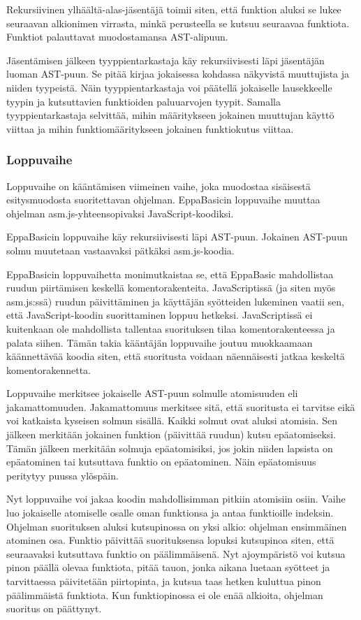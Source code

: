 Rekursiivinen ylhäältä-alas-jäsentäjä
toimii siten, että funktion aluksi
se lukee seuraavan alkionimen virrasta,
minkä perusteella se kutsuu seuraavaa
funktiota.
Funktiot palauttavat muodostamansa
AST-alipuun.

Jäsentämisen jälkeen tyyppientarkastaja
käy rekursiivisesti läpi jäsentäjän
luoman AST-puun.
Se pitää kirjaa jokaisessa kohdassa
näkyvistä muuttujista ja niiden tyypeistä.
Näin tyyppientarkastaja voi päätellä
jokaiselle lausekkeelle tyypin
ja kutsuttavien funktioiden
paluuarvojen tyypit.
Samalla tyyppientarkastaja selvittää,
mihin määritykseen jokainen muuttujan
käyttö viittaa ja mihin funktiomääritykseen
jokainen funktiokutus viittaa.

\subsubsection{Loppuvaihe}
Loppuvaihe on kääntämisen viimeinen vaihe,
joka muodostaa sisäisestä esitysmuodosta
suoritettavan ohjelman.
EppaBasicin loppuvaihe muuttaa ohjelman
asm.js-yhteensopi\-vaksi \cite{asm.js}
JavaScript-koodiksi.

EppaBasicin loppuvaihe käy rekursiivisesti
läpi AST-puun.
Jokainen AST-puun solmu muutetaan
vastaavaksi pätkäksi asm.js-koodia.

EppaBasicin loppuvaihetta monimutkaistaa se,
että EppaBasic mahdollistaa ruudun piirtämisen
keskellä komentorakenteita.
JavaScriptissä (ja siten myös asm.js:ssä)
ruudun päivittäminen ja käyttäjän syötteiden
lukeminen vaatii sen, että JavaScript-koodin
suorittaminen loppuu hetkeksi.
JavaScriptissä ei kuitenkaan ole
mahdollista tallentaa suorituksen tilaa
komentorakenteessa ja palata siihen.
Tämän takia kääntäjän loppuvaihe
joutuu muokkaamaan käännettävää
koodia siten, että suoritusta
voidaan näennäisesti jatkaa
keskeltä komentorakennetta.

Loppuvaihe merkitsee jokaiselle
AST-puun solmulle atomisuuden
eli jakamattomuuden.
Jakamattomuus merkitsee sitä,
että suoritusta ei tarvitse eikä voi
katkaista kyseisen solmun sisällä.
Kaikki solmut ovat aluksi atomisia.
Sen jälkeen merkitään jokainen
funktion  (päivittää ruudun)
kutsu epäatomiseksi.
Tämän jälkeen merkitään solmuja
epäatomisiksi, jos jokin niiden
lapsista on epäatominen tai
kutsuttava funktio on epäatominen.
Näin epäatomisuus peritytyy
puussa ylöspäin.

Nyt loppuvaihe voi jakaa koodin
mahdollisimman pitkiin atomisiin osiin.
Vaihe luo jokaiselle atomiselle osalle oman
funktionsa ja antaa funktioille indeksin.
Ohjelman suorituksen aluksi kutsupinossa
on yksi alkio: ohjelman ensimmäinen
atominen osa.
Funktio päivittää suorituksensa
lopuksi kutsupinoa siten,
että seuraavaksi kutsuttava
funktio on päälimmäisenä.
Nyt ajoympäristö voi kutsua
pinon päällä olevaa funktiota,
pitää tauon, jonka aikana
luetaan syötteet ja tarvittaessa
päivitetään piirtopinta,
ja kutsua taas hetken kuluttua
pinon päälimmäistä funktiota.
Kun funktiopinossa ei ole
enää alkioita, ohjelman suoritus
on päättynyt.

